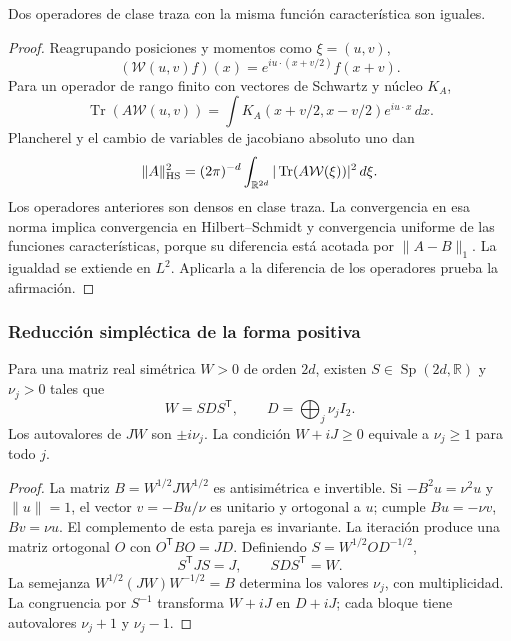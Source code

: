 \begin{lemma}
\label{md:antmem:gauss:lem:unicidad-weyl}
Dos operadores de clase traza con la misma función característica son iguales.
\end{lemma}
\begin{proof}
Reagrupando posiciones y momentos como \(\xi=(u,v)\),
\[
 (\mathcal W(u,v)f)(x)=e^{iu\cdot(x+v/2)}f(x+v).
\]
Para un operador de rango finito con vectores de Schwartz y núcleo \(K_A\),
\[
 \operatorname{Tr}(A\mathcal W(u,v))=\int K_A(x+v/2,x-v/2)e^{iu\cdot x}\,dx.
\]
Plancherel y el cambio de variables de jacobiano absoluto uno dan
\[
 \|A\|_{\rm HS}^2=(2\pi)^{-d}\int_{\mathbb R^{2d}}
 |\operatorname{Tr}(A\mathcal W(\xi))|^2\,d\xi.
\]
Los operadores anteriores son densos en clase traza. La convergencia
en esa norma implica convergencia en Hilbert--Schmidt y convergencia
uniforme de las funciones características, porque su diferencia está
acotada por \(\|A-B\|_1\). La igualdad se extiende en \(L^2\).
Aplicarla a la diferencia de los operadores prueba la afirmación.
\end{proof}

\subsubsection{Reducción simpléctica de la forma positiva}
\begin{theorem}
\label{md:antmem:gauss:thm:williamson}
Para una matriz real simétrica \(W>0\) de orden \(2d\), existen
\(S\in\operatorname{Sp}(2d,\mathbb R)\) y \(\nu_j>0\) tales que
\[
 W=SDS^{\mathsf T},\qquad D=\bigoplus_j\nu_jI_2.
\]
Los autovalores de \(JW\) son \(\pm i\nu_j\). La condición
\(W+iJ\geq0\) equivale a \(\nu_j\geq1\) para todo \(j\).
\end{theorem}
\begin{proof}
La matriz \(B=W^{1/2}JW^{1/2}\) es antisimétrica e invertible.
Si \(-B^2u=\nu^2u\) y \(\|u\|=1\), el vector
\(v=-Bu/\nu\) es unitario y ortogonal a \(u\); cumple
\(Bu=-\nu v\), \(Bv=\nu u\). El complemento de esta pareja es
invariante. La iteración produce una matriz ortogonal \(O\) con
\(O^{\mathsf T}BO=JD\). Definiendo \(S=W^{1/2}OD^{-1/2}\),
\[
 S^{\mathsf T}JS=J,\qquad SDS^{\mathsf T}=W.
\]
La semejanza \(W^{1/2}(JW)W^{-1/2}=B\) determina los valores
\(\nu_j\), con multiplicidad. La congruencia por \(S^{-1}\)
transforma \(W+iJ\) en \(D+iJ\); cada bloque tiene autovalores
\(\nu_j+1\) y \(\nu_j-1\).
\end{proof}


